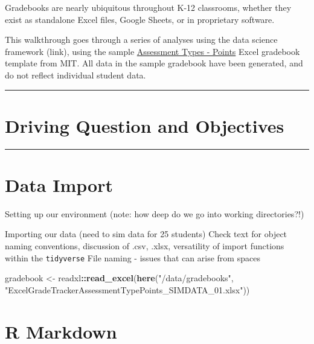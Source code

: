 \documentclass[]{book}
\newenvironment{Shaded}{\begin{snugshade}}{\end{snugshade}}
\newcommand{\KeywordTok}[1]{\textcolor[rgb]{0.13,0.29,0.53}{\textbf{#1}}}
\newcommand{\StringTok}[1]{\textcolor[rgb]{0.31,0.60,0.02}{#1}}
\newcommand{\OperatorTok}[1]{\textcolor[rgb]{0.81,0.36,0.00}{\textbf{#1}}}
\newcommand{\NormalTok}[1]{#1}
\begin{document}
Gradebooks are nearly ubiquitous throughout K-12 classrooms, whether
they exist as standalone Excel files, Google Sheets, or in proprietary
software.

This walkthrough goes through a series of analyses using the data
science framework (link), using the sample
\href{http://web.mit.edu/jabbott/www/excelgradetracker.html}{Assessment
Types - Points} Excel gradebook template from MIT. All data in the
sample gradebook have been generated, and do not reflect individual
student data.

\begin{center}\rule{0.5\linewidth}{\linethickness}\end{center}

\section{Driving Question and
Objectives}\label{driving-question-and-objectives}

\begin{center}\rule{0.5\linewidth}{\linethickness}\end{center}

\section{Data Import}\label{data-import}

Setting up our environment (note: how deep do we go into working
directories?!)

Importing our data (need to sim data for 25 students) Check text for
object naming conventions, discussion of .csv, .xlsx, versatility of
import functions within the \texttt{tidyverse} File naming - issues that
can arise from spaces

\begin{Shaded}
\begin{Highlighting}[]
\NormalTok{gradebook <-}\StringTok{ }\NormalTok{readxl}\OperatorTok{::}\KeywordTok{read_excel}\NormalTok{(}\KeywordTok{here}\NormalTok{(}\StringTok{"/data/gradebooks"}\NormalTok{, }\StringTok{"ExcelGradeTrackerAssessmentTypePoints_SIMDATA_01.xlsx"}\NormalTok{))}
\end{Highlighting}
\end{Shaded}

\section{R Markdown}\label{r-markdown}
\end{document}
